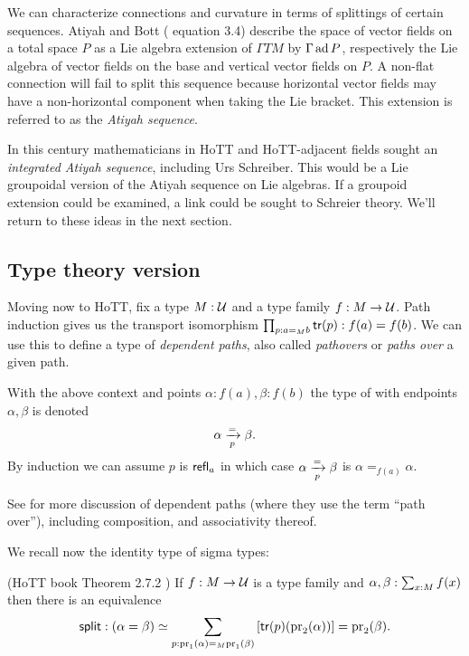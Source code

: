 We can characterize connections and curvature in terms of splittings of certain sequences. Atiyah and Bott (\cite{atiyah1983yang} equation 3.4) describe the space of vector fields on a total space \( P \) as a Lie algebra extension of \( \Gamma TM \) by \( \Gamma \operatorname{ad} P \), respectively the Lie algebra of vector fields on the base and vertical vector fields on \( P \). A non-flat connection will fail to split this sequence because horizontal vector fields may have a non-horizontal component when taking the Lie bracket. This extension is referred to as the \emph{Atiyah sequence}. 

In this century mathematicians in HoTT and HoTT-adjacent fields sought an \emph{integrated Atiyah sequence}, including Urs Schreiber\cite{urs_atiyah}\cite{urs_atiyah_blog}. This would be a Lie groupoidal version of the Atiyah sequence on Lie algebras. If a groupoid extension could be examined, a link could be sought to Schreier theory. We'll return to these ideas in the next section.

\subsection{Type theory version}

Moving now to HoTT, fix a type \( M:\mathcal{U} \) and a type family \( f:M\to\mathcal{U} \). Path induction gives us the transport isomorphism \( \prod_{p:a=_M b}\mathsf{tr}(p):f(a)=f(b) \). We can use this to define a type of \emph{dependent paths}, also called \emph{pathovers} or \emph{paths over} a given path.

\begin{mydef}
With the above context and points \( \alpha:f(a), \beta:f(b) \) the type of  with endpoints \( \alpha, \beta \) is denoted
\[ \alpha\xrightarrow[{p}]{=}\beta.
\]
By induction we can assume \( p \) is \( \mathsf{refl}_a \) in which case \( \alpha\xrightarrow[{p}]{=}\beta \) is \( \alpha=_{f(a)}\alpha \).
\end{mydef}

See \cite{Symmetry} for more discussion of dependent paths (where they use the term ``path over''), including composition, and associativity thereof.

We recall now the identity type of sigma types:

\begin{mythm}\label{thm:idsit}
(HoTT book Theorem 2.7.2 \cite{hottbook}) If \( f:M\to \mathcal{U} \) is a type family and \( \alpha,\beta:\sum_{x:M}f(x) \) then there is an equivalence 
\[ 
\mathsf{split}:(\alpha=\beta)\simeq \sum_{p:\mathrm{pr}_1(\alpha)=_M\mathrm{pr}_1(\beta)} \left[\mathsf{tr}(p)(\mathrm{pr}_2(\alpha))\right] = \mathrm{pr}_2(\beta).
\]
\end{mythm}

